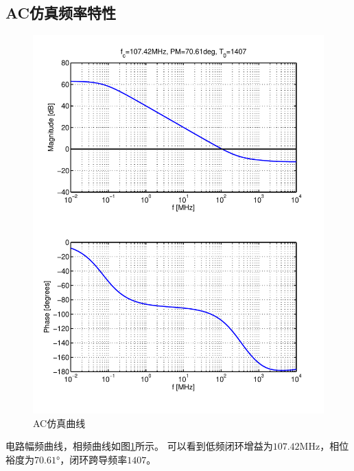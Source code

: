 \documentclass[a4paper]{article}
\newcommand{\uMHz}{\si{\mega\hertz}}
\newcommand{\udeg}{\si{\degree}}
\begin{document}
\subsection{AC仿真频率特性}
\begin{figure}[htb]
    \begin{center}
        \includegraphics[width=\textwidth]{common/ac.pdf}
    \end{center}
    \caption{AC仿真曲线}
    \label{commonac}
\end{figure}
电路幅频曲线，相频曲线如图\ref{commonac}所示。
可以看到低频闭环增益为$107.42\uMHz$，相位裕度为$70.61\udeg$，闭环跨导频率$1407$。
\newpage
\end{document}
